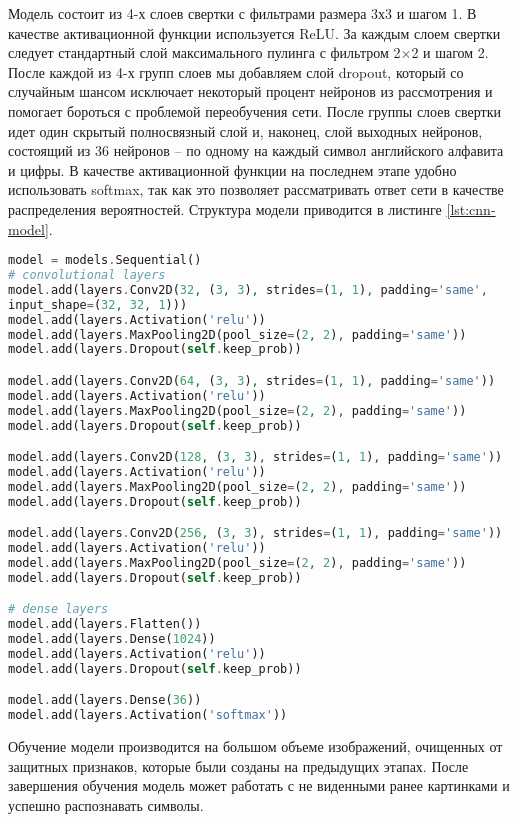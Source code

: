 Модель состоит из 4-х слоев свертки с фильтрами размера 3х3 и шагом 1. В качестве активационной функции используется ReLU. За каждым слоем свертки следует стандартный слой максимального пулинга с фильтром 2$\times$2 и шагом 2. После каждой из 4-х групп слоев мы добавляем слой dropout, который со случайным шансом исключает некоторый процент нейронов из рассмотрения и помогает бороться с проблемой переобучения сети. После группы слоев свертки идет один скрытый полносвязный слой и, наконец, слой выходных нейронов, состоящий из 36 нейронов – по одному на каждый символ английского алфавита и цифры. В качестве активационной функции на последнем этапе удобно использовать softmax, так как это позволяет рассматривать ответ сети в качестве распределения вероятностей. Структура модели приводится в листинге \ref{lst:cnn-model}.
\begin{lstlisting}[language=PHP,basicstyle=\fontsize{11}{11}\selectfont,tabsize=4,breaklines=true,caption={Структура модели для распознавания символов.},captionpos=b,label={lst:cnn-model}]
model = models.Sequential()
# convolutional layers
model.add(layers.Conv2D(32, (3, 3), strides=(1, 1), padding='same',
input_shape=(32, 32, 1)))
model.add(layers.Activation('relu'))
model.add(layers.MaxPooling2D(pool_size=(2, 2), padding='same'))
model.add(layers.Dropout(self.keep_prob))

model.add(layers.Conv2D(64, (3, 3), strides=(1, 1), padding='same'))
model.add(layers.Activation('relu'))
model.add(layers.MaxPooling2D(pool_size=(2, 2), padding='same'))
model.add(layers.Dropout(self.keep_prob))

model.add(layers.Conv2D(128, (3, 3), strides=(1, 1), padding='same'))
model.add(layers.Activation('relu'))
model.add(layers.MaxPooling2D(pool_size=(2, 2), padding='same'))
model.add(layers.Dropout(self.keep_prob))

model.add(layers.Conv2D(256, (3, 3), strides=(1, 1), padding='same'))
model.add(layers.Activation('relu'))
model.add(layers.MaxPooling2D(pool_size=(2, 2), padding='same'))
model.add(layers.Dropout(self.keep_prob))

# dense layers
model.add(layers.Flatten())
model.add(layers.Dense(1024))
model.add(layers.Activation('relu'))
model.add(layers.Dropout(self.keep_prob))

model.add(layers.Dense(36))
model.add(layers.Activation('softmax'))
\end{lstlisting}

Обучение модели производится на большом объеме изображений, очищенных от защитных признаков, которые были созданы на предыдущих этапах. После завершения обучения модель может работать с не виденными ранее картинками и успешно распознавать символы.
